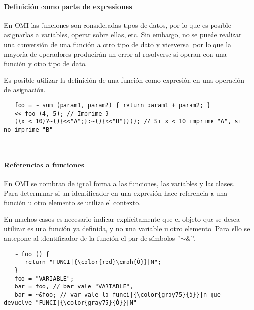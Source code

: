 \paragraph{Definición como parte de expresiones}

En OMI las funciones son consideradas tipos de datos, por lo que es posible asignarlas 
a variables, operar sobre ellas, etc. Sin embargo, no se puede realizar una conversión
de una función a otro tipo de dato y viceversa, por lo que la mayoría de operadores producirán 
un error al resolverse si operan con una función y otro tipo de dato.

Es posible utilizar la definición de una función como expresión en una operación de asignación. \\

\begin{lstlisting}
   foo = ~ sum (param1, param2) { return param1 + param2; };
   << foo (4, 5); // Imprime 9
   ((x < 10)?~(){<<"A";}:~(){<<"B"})(); // Si x < 10 imprime "A", si no imprime "B"
\end{lstlisting}
\hfill\\ 

\paragraph{Referencias a funciones }
En OMI se nombran de igual forma a las funciones, las variables y las clases. Para determinar 
si un identificador en una expresión hace referencia a una función u otro elemento se utiliza 
el contexto. 

En muchos casos es necesario indicar explícitamente que el objeto que se desea utilizar es una 
función ya definida, y no una variable u otro elemento. Para ello se antepone al identificador 
de la función el par de símbolos ``$\sim\&$''. \\




\begin{lstlisting}
   ~ foo () {
      return "FUNCI|{\color{red}\emph{Ó}}|N";
   }
   foo = "VARIABLE";
   bar = foo; // bar vale "VARIABLE";
   bar = ~&foo; // var vale la funci|{\color{gray75}{ó}}|n que devuelve "FUNCI|{\color{gray75}{Ó}}|N" 
\end{lstlisting}
\hfill\\ 


